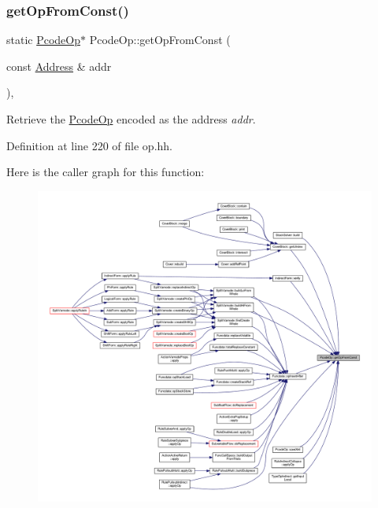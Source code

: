 \subsubsection{\texorpdfstring{getOpFromConst()}{getOpFromConst()}}
{\footnotesize\ttfamily static \mbox{\hyperlink{class_pcode_op}{Pcode\+Op}}$\ast$ Pcode\+Op\+::get\+Op\+From\+Const (\begin{DoxyParamCaption}\item[{const \mbox{\hyperlink{class_address}{Address}} \&}]{addr }\end{DoxyParamCaption})\hspace{0.3cm}{\ttfamily [inline]}, {\ttfamily [static]}}



Retrieve the \mbox{\hyperlink{class_pcode_op}{Pcode\+Op}} encoded as the address {\itshape addr}. 



Definition at line 220 of file op.\+hh.

Here is the caller graph for this function\+:
\nopagebreak
\begin{figure}[H]
\begin{center}
\leavevmode
\includegraphics[width=350pt]{class_pcode_op_a41be82b850ff5185e51268aead2c2802_icgraph}
\end{center}
\end{figure}
\mbox{\label{class_pcode_op_a48b3ad5fe1afa59cee1be17d1ef5875f}} 
